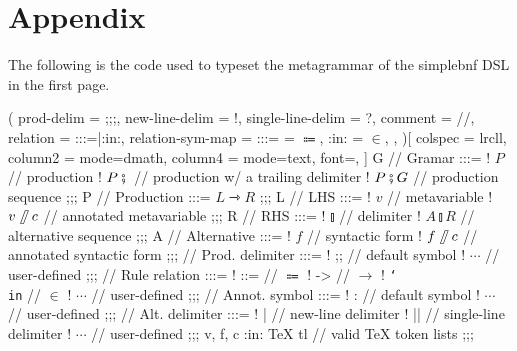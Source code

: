 \documentclass[11pt]{article}
\begin{document}
\section*{Appendix}\label{sec:appendix}
The following is the code used to typeset the metagrammar of the \textsf{simplebnf} DSL in the first page.
\begin{listing}[breakable]
\begin{bnf}(
  prod-delim = ;;;,
  new-line-delim = !,
  single-line-delim = ?,
  comment = //,
  relation = {:::=|:in:},
  relation-sym-map =
    {
      {:::=} = $\Coloneqq$,
      {:in:} = $\in$,
    },
)[
  colspec = lrcll,
  column{2} = {mode=dmath},
  column{4} = {mode=text, font=\ttfamily},
]
  G // Gramar :::=
  ! $P$ // production
  ! $P \fatsemi {}$ // production w/ a trailing delimiter
  ! $P \fatsemi G$ // production sequence
;;;
  P // Production :::= $L \rightarrowtriangle R$
;;;
  L // LHS :::=
  ! $v$ // metavariable
  ! $v\!\fatslash\,c$ // annotated metavariable
;;;
  R // RHS :::=
  ! $\talloblong$ // delimiter
  ! $A \talloblong R$ // alternative sequence
;;;
  A // Alternative :::=
  ! $f$ // syntactic form
  ! $f\!\fatslash\,c$ // annotated syntactic form
;;;
  \fatsemi // Prod. delimiter :::=
  ! ;; // default symbol
  ! $\cdots$ // user-defined
;;;
  \rightarrowtriangle // Rule relation :::=
  ! ::= // $\Coloneqq$
  ! -> // $\to$
  ! \texttt{\char`\\in} // $\in$
  ! $\cdots$ // user-defined
;;;
  \fatslash // Annot. symbol :::=
  ! : // default symbol
  ! $\cdots$ // user-defined
;;;
  \talloblong // Alt. delimiter :::=
  ! | // new-line delimiter
  ! || // single-line delimiter
  ! $\cdots$ // user-defined
;;;
  v, f, c :in: \textsf{\TeX{} tl} // valid \TeX{} token lists
;;;
\end{bnf}
\end{listing}
\end{document}
